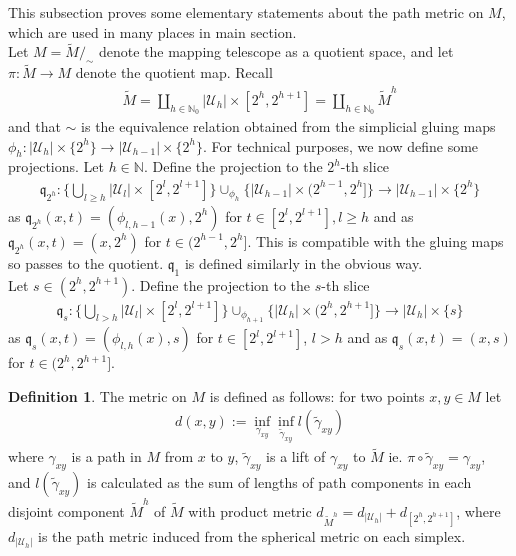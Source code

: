 \documentclass[a4paper,11pt]{article}
\theoremstyle{definition}
\newtheorem{definition}{Definition}[section]
\theoremstyle{plain}
\theoremstyle{remark}
\begin{document}
{This subsection proves some elementary statements about the path metric on $M$, which are used in many places in main section. \\

Let $M = \tilde{M}/_{\sim}$ denote the mapping telescope as a quotient space, and let $\pi: \tilde{M}\rightarrow M$ denote the quotient map. Recall 
\begin{align*}
\tilde{M} = \coprod_{h\in \mathbb{N}_{0}} |\mathcal{U}_{h}| \times [2^h,2^{h+1}] = \coprod_{h\in \mathbb{N}_{0}} \tilde{M}^{h}
\end{align*}
and that $\sim$ is the equivalence relation obtained from the simplicial gluing maps $\phi_{h}: |\mathcal{U}_{h}| \times \{2^h\}\rightarrow |\mathcal{U}_{h-1}| \times \{2^{h}\}$. For technical purposes, we now define some projections. Let $h\in \mathbb{N}$. Define the projection to the $2^{h}$-th slice
\begin{align*}
\mathfrak{q}_{2^{h}}: \big\{ \bigcup_{l\geq h} |\mathcal{U}_{l}| \times [2^l,2^{l+1}] \big\} \cup_{\phi_{h}} \big\{ |\mathcal{U}_{h-1}| \times (2^{h-1}, 2^h]\big\} \longrightarrow |\mathcal{U}_{h-1}| \times \{2^h\}
\end{align*}
as $\mathfrak{q}_{2^h}(x,t)=(\phi_{l,h-1}(x),2^h)$ for $t\in [2^l,2^{l+1}], l\geq h$ and as $\mathfrak{q}_{2^h}(x,t) = (x,2^h)$ for $t\in (2^{h-1}, 2^h]$. This is compatible with the gluing maps so passes to the quotient. $\mathfrak{q}_1$ is defined similarly in the obvious way. \\

Let $s\in (2^h,2^{h+1})$. Define the projection to the $s$-th slice 
\begin{align*}
\mathfrak{q}_{s}: \big\{ \bigcup_{l> h} |\mathcal{U}_{l}| \times [2^l,2^{l+1}] \big\} \cup_{\phi_{h+1}} \big\{  |\mathcal{U}_{h}| \times (2^h, 2^{h+1}] \big\}\longrightarrow |\mathcal{U}_{h}| \times \{s\}
\end{align*}
as $\mathfrak{q}_{s}(x,t) = (\phi_{l,h}(x),s)$ for $t\in [2^l,2^{l+1}]$, $l> h$ and as $\mathfrak{q}_{s}(x,t) = (x,s)$ for $t\in (2^h,2^{h+1}]$.

\begin{definition} \label{metricdef} The metric on $M$ is defined as follows: for two points $x,y\in M$ let
\begin{align*}
d(x,y):= \inf_{\gamma_{xy}} \inf_{\tilde{\gamma}_{xy}}  l(\tilde{\gamma}_{xy})
\end{align*}
where $\gamma_{xy}$ is a path in $M$ from $x$ to $y$, $\tilde{\gamma}_{xy}$ is a lift of $\gamma_{xy}$ to $\tilde{M}$ ie. $\pi\circ \tilde{\gamma}_{xy} = \gamma_{xy}$, and $l(\tilde{\gamma}_{xy})$ is calculated as the sum of lengths of path components in each disjoint component $\tilde{M}^{h}$ of $\tilde{M}$ with product metric $d_{\tilde{M}^{h}} = d_{|\mathcal{U}_{h}|} + d_{[2^h,2^{h+1}]}$, where $d_{|\mathcal{U}_{h}|}$ is the path metric induced from the spherical metric on each simplex. 
\end{definition} 


}
\end{document}
